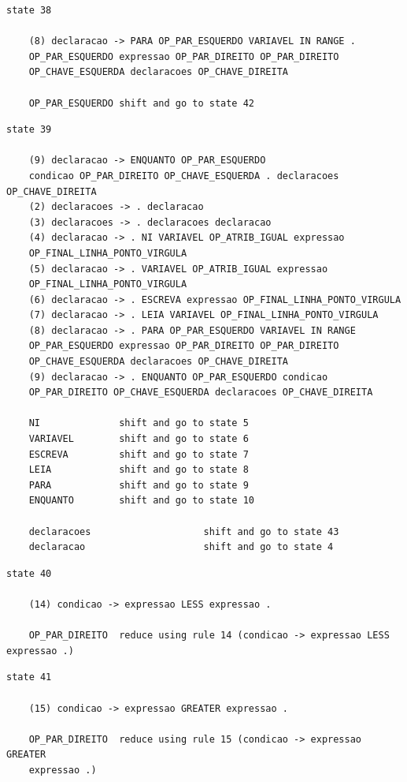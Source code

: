 \documentclass[a4paper,12pt]{article}
\begin{document}
\begin{verbatim}
state 38

    (8) declaracao -> PARA OP_PAR_ESQUERDO VARIAVEL IN RANGE . 
    OP_PAR_ESQUERDO expressao OP_PAR_DIREITO OP_PAR_DIREITO 
    OP_CHAVE_ESQUERDA declaracoes OP_CHAVE_DIREITA

    OP_PAR_ESQUERDO shift and go to state 42

\end{verbatim}

\begin{verbatim}
state 39

    (9) declaracao -> ENQUANTO OP_PAR_ESQUERDO 
    condicao OP_PAR_DIREITO OP_CHAVE_ESQUERDA . declaracoes OP_CHAVE_DIREITA
    (2) declaracoes -> . declaracao
    (3) declaracoes -> . declaracoes declaracao
    (4) declaracao -> . NI VARIAVEL OP_ATRIB_IGUAL expressao 
    OP_FINAL_LINHA_PONTO_VIRGULA
    (5) declaracao -> . VARIAVEL OP_ATRIB_IGUAL expressao 
    OP_FINAL_LINHA_PONTO_VIRGULA
    (6) declaracao -> . ESCREVA expressao OP_FINAL_LINHA_PONTO_VIRGULA
    (7) declaracao -> . LEIA VARIAVEL OP_FINAL_LINHA_PONTO_VIRGULA
    (8) declaracao -> . PARA OP_PAR_ESQUERDO VARIAVEL IN RANGE 
    OP_PAR_ESQUERDO expressao OP_PAR_DIREITO OP_PAR_DIREITO 
    OP_CHAVE_ESQUERDA declaracoes OP_CHAVE_DIREITA
    (9) declaracao -> . ENQUANTO OP_PAR_ESQUERDO condicao 
    OP_PAR_DIREITO OP_CHAVE_ESQUERDA declaracoes OP_CHAVE_DIREITA

    NI              shift and go to state 5
    VARIAVEL        shift and go to state 6
    ESCREVA         shift and go to state 7
    LEIA            shift and go to state 8
    PARA            shift and go to state 9
    ENQUANTO        shift and go to state 10

    declaracoes                    shift and go to state 43
    declaracao                     shift and go to state 4

\end{verbatim}

\begin{verbatim}
state 40

    (14) condicao -> expressao LESS expressao .

    OP_PAR_DIREITO  reduce using rule 14 (condicao -> expressao LESS expressao .)

\end{verbatim}

\begin{verbatim}
state 41

    (15) condicao -> expressao GREATER expressao .

    OP_PAR_DIREITO  reduce using rule 15 (condicao -> expressao GREATER 
    expressao .)

\end{verbatim}
\end{document}
